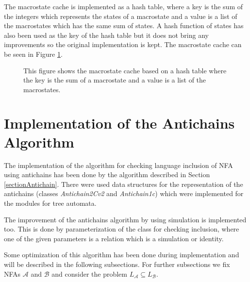 The macrostate cache is implemented as a hash table, where a key is the sum of the integers which represents the states of a macrostate and a value is a
list of the macrostates which has the same sum of states. A hash function of states has also been used as the key of the hash table
but it does not bring any improvements so the original implementation is kept. %
The macrostate cache can be seen in Figure \ref{figMacroCache}.

\begin{figure}[bt]
\begin{center}
  
  \caption{This figure shows the macrostate cache based on a hash table where the key is the sum of a macrostate and a value is a list of the macrostates.}
  \label{figMacroCache}
\end{center}
\end{figure}

\section{Implementation of the Antichains Algorithm}
The implementation of the algorithm for checking language inclusion of NFA using anti\-chains has been done by the algorithm described in Section 
\ref{sectionAntichain}.  There were used data structures for the representation of the antichains (classes \emph{Antichain2Cv2} and \emph{Antichain1c}) which
were implemented for the modules for tree automata. 

The improvement of the antichains algorithm by using simulation is implemented too. 
This is done by parameterization of the class for checking inclusion, where one of the given parameters is a relation which is a simulation or identity.

Some optimization of this algorithm has been done during implementation and will be described in the following subsections. For further subsections we fix
NFAs $\mathcal{A}$ and $\mathcal{B}$ and consider the problem $L_{\mathcal{A}}\subseteq L_{\mathcal{B}}$.

